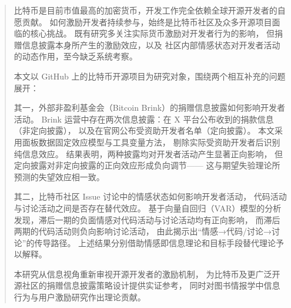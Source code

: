 \documentclass[
    type = master, %
    degree = professional,        %
    decl-page,  %
    twoside,                %
    fontset = fandol %
  ]{njuthesis}
\begin{document}

\maketitle
\raggedbottom

\begin{abstract}
比特币是目前市值最高的加密货币，开发工作完全依赖全球开源开发者的自愿贡献。
如何激励开发者持续参与，始终是比特币社区及众多开源项目面临的核心挑战。
既有研究多关注实际货币激励对开发者行为的影响，
但捐赠信息披露本身所产生的激励效应，以及
社区内部情感状态对开发者活动的动态作用，至今缺乏系统考察。

本文以 GitHub 上的比特币开源项目为研究对象，围绕两个相互补充的问题展开：

其一，外部非盈利基金会（Bitcoin Brink）的捐赠信息披露如何影响开发者活动。
Brink 运营中存在两次信息披露：在 X 平台公布收到的捐款信息（非定向披露），
以及在官网公布受资助开发者名单（定向披露）。
本文采用面板数据固定效应模型与工具变量方法，
剔除实际受资助开发者后识别纯信息效应。
结果表明，两种披露均对开发者活动产生显著正向影响，
但定向披露对非定向披露的正向效应形成负向调节——
这与期望失验理论所预测的失望效应相一致。

其二，比特币社区 Issue 讨论中的情感状态如何影响开发者活动，
代码活动与讨论活动之间是否存在替代效应。
基于向量自回归（VAR）模型的分析发现，滞后一期的负面情感对代码活动与讨论活动均有正向影响，
而滞后两期的代码活动则负向影响讨论活动，
由此揭示出“情感→代码/讨论→讨论”的传导路径。
上述结果分别借助情感即信息理论和目标手段替代理论予以解释。

本研究从信息视角重新审视开源开发者的激励机制，
为比特币及更广泛开源社区的捐赠信息披露策略设计提供实证参考，
同时对图书情报学中信息行为与用户激励研究作出理论贡献。
\end{abstract}
\end{document}
